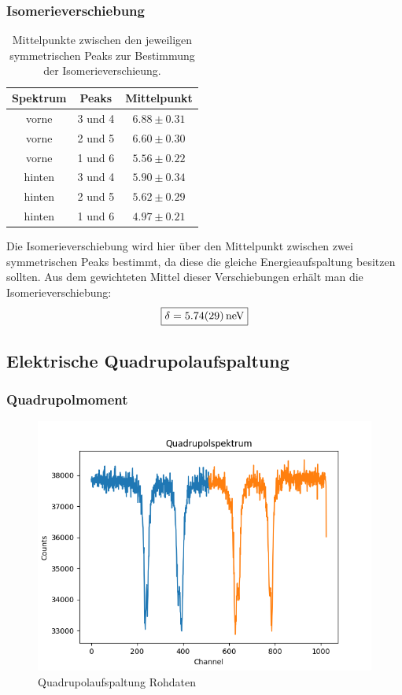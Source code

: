 \documentclass[12pt,a4paper]{article}
\begin{document}
\subsubsection{Isomerieverschiebung}
\begin{table}
\centering
\begin{tabular}{|c|c|c|}
\hline 
Spektrum & Peaks & Mittelpunkt \\ 
\hline 
vorne & 3 und 4 & $6.88\pm 0.31$ \\ 
\hline 
vorne & 2 und 5 & $6.60\pm 0.30$ \\ 
\hline 
vorne & 1 und 6 & $5.56\pm 0.22$ \\ 
\hline
\hline
hinten & 3 und 4 & $5.90\pm 0.34$ \\ 
\hline 
hinten & 2 und 5 & $5.62\pm 0.29$ \\ 
\hline 
hinten & 1 und 6 & $4.97\pm 0.21$ \\ 
\hline 
\end{tabular} 
\caption{Mittelpunkte zwischen den jeweiligen symmetrischen Peaks zur Bestimmung der Isomerieverschieung.}
\label{tab:Hyper_Iso}
\end{table}

Die Isomerieverschiebung wird hier über den Mittelpunkt zwischen zwei symmetrischen Peaks bestimmt, da diese die gleiche Energieaufspaltung besitzen sollten. Aus dem gewichteten Mittel dieser Verschiebungen erhält man die Isomerieverschiebung:
\begin{equation*}
\boxed{\delta = \SI{5.74\pm 0.29}{neV}}
\end{equation*}


\subsection{Elektrische Quadrupolaufspaltung}

\subsubsection{Quadrupolmoment}

\begin{figure}
\centering
\includegraphics[scale=0.8]{Bilder/Quadrupol/Quad_Roh.png}
\caption{Quadrupolaufspaltung Rohdaten}
\label{fig:Quad_Roh}
\end{figure}
\end{document}
